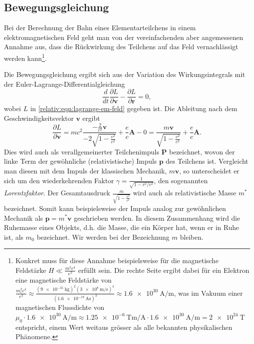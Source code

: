 \subsection{Bewegungsgleichung
\label{relativ:section:bewegungsgleichung}}

Bei der Berechnung der Bahn eines Elementarteilchens
in einem elektromagnetischen Feld geht man von
der vereinfachenden aber angemessenen Annahme aus,
dass die Rückwirkung des Teilchens auf das Feld vernachlässigt werden kann\footnote{
Konkret muss für diese Annahme beispielsweise
für die magnetische Feldstärke
\(H \ll \frac{m^2c^4}{e^3}\) erfüllt sein.
Die rechte Seite ergibt dabei für ein Elektron
eine magnetische Feldstärke von
\(\frac{m_e^2c^4}{e^3} \approx
\frac{(\qty{9e-31}{\kilogram})^2 (\qty{3e8}{\metre\per\second})^4}{(\qty{1.6e-19}{\ampere\second})^3}
\approx \qty[per-mode=fraction]{1.6e30}{\ampere\per\metre}\),
was im Vakuum einer magnetischen Flussdichte von
\(\mu_0 \cdot \qty[per-mode=fraction]{1.6e30}{\ampere\per\metre} \approx
\qty[per-mode=fraction]{1.25e-6}{\tesla\metre\per\ampere} \cdot
\qty[per-mode=fraction]{1.6e30}{\ampere\per\metre} =
\qty{2e24}{\tesla}\)
entspricht, einem Wert weitaus grösser als alle bekannten physikalischen Phänomene.}.

Die Bewegungsgleichung ergibt sich aus der Variation des Wirkungsintegrals
mit der Euler-Lagrange-Differentialgleichung
\begin{equation}
    \frac{d}{dt} \frac{\partial L}{\partial \bm{v}} - \frac{\partial L}{\partial \bm{r}} = 0,
    \label{relativ:eqn:euler-lagrange-em-feld}
\end{equation}
wobei \(L\) in \eqref{relativ:eqn:lagrange-em-feld} gegeben ist.
Die Ableitung nach dem Geschwindigkeitsvektor \(\bm{v}\) ergibt
\begin{equation}
    \frac{\partial L}{\partial \bm{v}} =
    mc^2 \frac{-\frac{2}{c^2}\bm{v}}{-2\sqrt{1-\frac{v^2}{c^2}}}
    + \frac{e}{c} \bm{A} - 0
    = \frac{m \bm{v}}{\sqrt{1-\frac{v^2}{c^2}}} + \frac{e}{c} \bm{A}.
    \label{relativ:eqn:part-diff-v}
\end{equation}
Dies wird auch als verallgemeinerter Teilchenimpuls \(\bm{P}\) bezeichnet,
wovon der linke Term der gewöhnliche (relativistische) Impuls \(\bm{p}\)
des Teilchens ist.
Vergleicht man diesen mit dem Impuls der klassischen Mechanik, \(m\bm{v}\),
so unterscheidet er sich um den wiederkehrenden Faktor
\(\gamma=\frac{1}{\sqrt{1-v^2/c^2}}\), den sogenannten \emph{Lorentzfaktor}.
Der Gesamtausdruck \(\frac{m}{\sqrt{1-\frac{v^2}{c^2}}}\) wird auch als
relativistische Masse \(m^*\) bezeichnet. Somit kann beispielsweise der
Impuls analog zur gewöhnlichen Mechanik als
\(\bm{p}=m^*\bm{v}\) geschrieben werden.
In diesem Zusammenhang wird die Ruhemasse eines Objekts, d.h.
die Masse, die ein Körper hat, wenn er in Ruhe ist,
als \(m_0\) bezeichnet.
Wir werden bei der Bezeichnung \(m\) bleiben.

